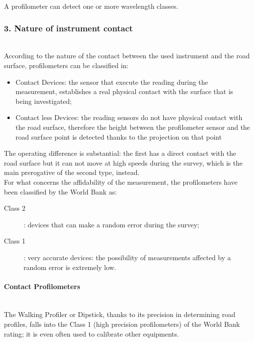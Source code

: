 \documentclass{standalone}
\begin{document}
\noindent A profilometer can detect one or more wavelength classes.

\clearpage
\subsubsection{3. Nature of instrument contact}\label{Instrument_Contact}\leavevmode\\
According to the nature of the contact between the used instrument and the road surface, profilometers can be classified in:
\begin{itemize}
\item Contact Devices: the sensor that execute the reading during the measurement, establishes a real physical contact with the surface that is being investigated;

\item Contact less Devices: the reading sensors do not have physical contact with the road surface, therefore the height between the profilometer sensor and the road surface point is detected thanks to the projection on that point
\end{itemize}
\noindent The operating difference is substantial: the first has a direct contact with the road surface but it can not move at high speeds during the survey, which is the main prerogative of the second type, instead. \\For what concerns the affidability of the measurement, the profilometers have been classified by the World Bank as:\cite{sayers1995calculation}
\begin{description}

	\item [Class 2]: devices that can make a random error during the survey;
	\item [Class 1]: very accurate devices: the possibility of measurements affected by a random error is extremely low.

\end{description}

\paragraph{Contact Profilometers}\leavevmode\\
The Walking Profiler or Dipstick\cite{little_book}, thanks to its precision in determining road profiles, falls into the Class 1 (high precision profilometers) of the World Bank rating\cite{sayers1995calculation}; it is even often used to calibrate other equipments.
\end{document}
